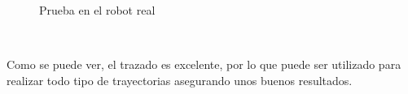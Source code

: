 \begin{figure} [ht!]
    \centering  
    \hspace{1cm}
    \caption{Prueba en el robot real}
    \label{fig:real_draw}
\end{figure}\ 

Como se puede ver, el trazado es excelente, por lo que puede ser utilizado para realizar todo tipo de trayectorias asegurando unos buenos resultados.
